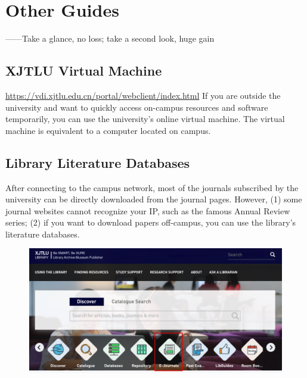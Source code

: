 
\chapter{Other Guides}

\begin{flushright}
    ——Take a glance, no loss; take a second look, huge gain
\end{flushright}

 \clearpage

 \clearpage

 \clearpage

 \clearpage

\section{XJTLU Virtual Machine}
\url{https://vdi.xjtlu.edu.cn/portal/webclient/index.html}
If you are outside the university and want to quickly access on-campus resources and software temporarily, you can use the university's online virtual machine. The virtual machine is equivalent to a computer located on campus.

\section{Library Literature Databases}
After connecting to the campus network, most of the journals subscribed by the university can be directly downloaded from the journal pages. However, (1) some journal websites cannot recognize your IP, such as the famous Annual Review series; (2) if you want to download papers off-campus, you can use the library's literature databases.

\begin{figure}[H]
    \includegraphics[width=0.7\columnwidth, center]{author-folder/Kai.Wu/library-ejournal.jpg}
\end{figure}


